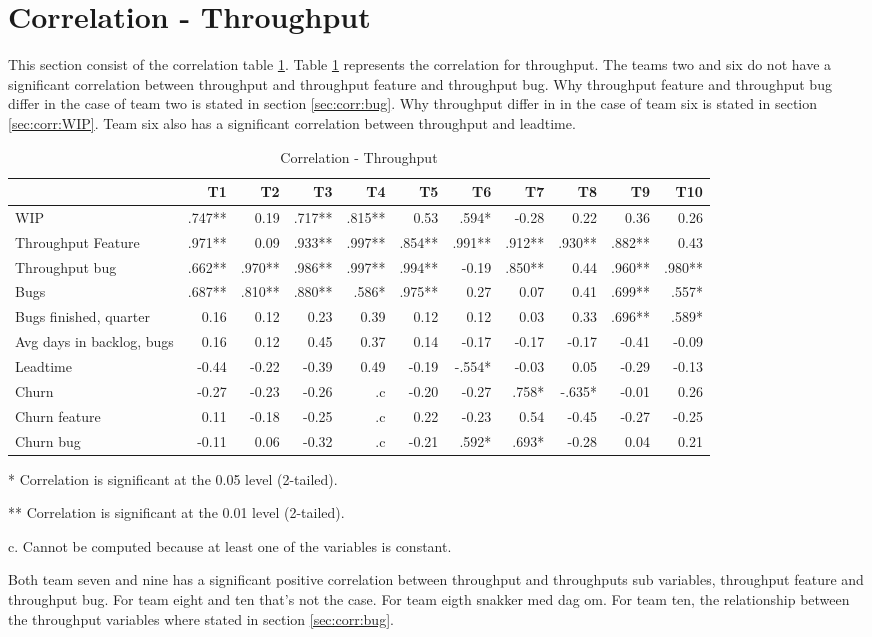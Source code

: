 \documentclass[UKenglish]{ifimaster}  %
\begin{document}
\section {Correlation - Throughput}
\label{sec:corr:TP}
This section consist of the correlation table \ref{corr:TP}. Table  \ref{corr:TP} represents the correlation for throughput. The teams two and six do not have a significant correlation between throughput and throughput feature and throughput bug. Why throughput feature and throughput bug differ in the case of team two is stated in section \ref{sec:corr:bug}. Why throughput differ in in the case of team six is stated in section \ref{sec:corr:WIP}. Team six also has a significant correlation between throughput and leadtime.
\begin{table}[!htbp]
 \begin{adjustwidth}{-2.5cm}{}
 \centering
 \begin{tabular}{|l|r|r|r|r|r|r|r|r|r|r|}
\hline
 & T1 & T2 & T3 & T4 & T5 & T6 & T7 & T8 & T9 & T10\\ \hline
WIP &.747**& 0.19& .717**& .815**& 0.53& .594*& -0.28& 0.22& 0.36& 0.26\\ \hline
Throughput Feature &.971**& 0.09& .933**& .997**& .854**& .991**& .912**& .930**& .882**& 0.43\\ \hline
Throughput bug &.662**& .970**& .986**& .997**& .994**& -0.19& .850**& 0.44& .960**& .980**\\ \hline
Bugs &.687**& .810**& .880**& .586*& .975**& 0.27& 0.07& 0.41& .699**& .557*\\ \hline
Bugs finished, quarter &0.16& 0.12& 0.23& 0.39& 0.12& 0.12& 0.03& 0.33& .696**& .589*\\ \hline
Avg days in backlog, bugs &0.16& 0.12& 0.45& 0.37& 0.14& -0.17& -0.17& -0.17& -0.41& -0.09\\ \hline
Leadtime &-0.44& -0.22& -0.39& 0.49& -0.19& -.554*& -0.03& 0.05& -0.29& -0.13\\ \hline
Churn &-0.27& -0.23& -0.26& .c& -0.20& -0.27& .758*& -.635*& -0.01& 0.26\\ \hline
Churn feature &0.11& -0.18& -0.25& .c& 0.22& -0.23& 0.54& -0.45& -0.27& -0.25\\ \hline
Churn bug &-0.11& 0.06& -0.32& .c
& -0.21& .592*
& .693*
& -0.28& 0.04& 0.21\\ \hline
\end{tabular}
 \caption{Correlation - Throughput}
 \label{corr:TP}
 \centerline {* Correlation is significant at the 0.05 level (2-tailed).}
\centerline{** Correlation is significant at the 0.01 level (2-tailed).}
\centerline{c. Cannot be computed because at least one of the variables is constant.}
\end{adjustwidth}
\end{table}
Both team seven and nine has a significant positive correlation between throughput and throughputs sub variables, throughput feature and throughput bug.  For team eight and ten that's not the case. For team eigth snakker med dag om. For team ten, the relationship between the throughput variables where stated in section \ref{sec:corr:bug}. 
\end{document}

